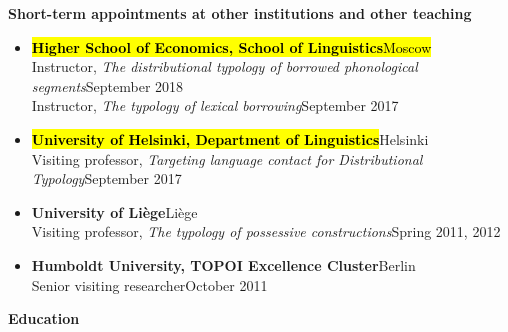 \documentclass[letterpaper,11pt]{article}
\newcommand{\resheading}[1]{
\vspace*{6pt}
{\large \colorbox{mygrey}{\begin{minipage}{\textwidth}{\textbf{#1 \vphantom{p\^{E}}}}\end{minipage}}}
}
\begin{document}
\vspace{4pt}
\resheading{Short-term appointments at other institutions and other teaching} 
\begin{itemize}
\vspace{-0.025 in}
\vspace*{-2pt}
\item \hl{\textbf{Higher School of Economics, School of Linguistics}\hfill{Moscow}}\\
{Instructor, \textit{The distributional typology of borrowed phonological segments}}\hfill{September 2018}\\
Instructor, \textit{The typology of lexical borrowing}\hfill{September 2017}
\item \hl{\textbf{University of Helsinki, Department of Linguistics}}\hfill{Helsinki}\\{Visiting professor, \textit{Targeting language contact for Distributional Typology}}\hfill{September 2017}\\
\item \textbf{University of Li\`ege}\hfill{Li\`ege}\\{Visiting professor, \textit{The typology of possessive constructions}}\hfill{Spring 2011, 2012}\\
\item \textbf{{Humboldt University, TOPOI Excellence Cluster}}\hfill{Berlin}\\{Senior visiting researcher}\hfill{October 2011}
\end{itemize}
\newpage
\resheading{Education} 
\end{document}
